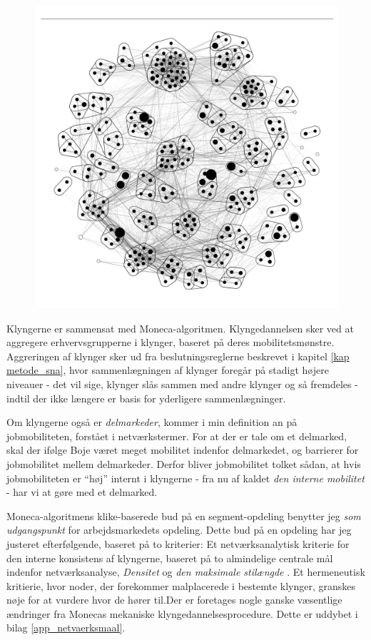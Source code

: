 \begin{figure}[H]
\begin{centering}
  \includegraphics[width=10 cm]{fig/netvaerkskort/kort_seg_proces_niveau5_praesentation.pdf}
  \caption{}
  \label{fig_seg_proces5}
\end{centering}
\end{figure}

Klyngerne er sammensat med Moneca-algoritmen. Klyngedannelsen sker ved at aggregere erhvervsgrupperne i klynger, baseret på deres mobilitetsmønstre. Aggreringen af klynger sker ud fra beslutningsreglerne beskrevet i kapitel \ref{kap metode_sna}, hvor sammenlægningen af klynger foregår på stadigt højere niveauer - det vil sige, klynger slås sammen med andre klynger og så fremdeles - indtil der ikke længere er basis for yderligere sammenlægninger. 

Om klyngerne også er \emph{delmarkeder}, kommer i min definition an på jobmobiliteten, forstået i netværkstermer. For at der er tale om et delmarked, skal der ifølge Boje været meget mobilitet indenfor delmarkedet, og barrierer for jobmobilitet mellem  delmarkeder. Derfor bliver jobmobilitet tolket sådan, at hvis jobmobiliteten er “høj” internt i klyngerne - fra nu af kaldet \emph{den interne mobilitet} - har vi at gøre med et delmarked. 

Moneca-algoritmens klike-baserede bud på en segment-opdeling benytter jeg \emph{som udgangspunkt} for arbejdsmarkedets opdeling. Dette bud på en opdeling har jeg justeret efterfølgende, baseret på to kriterier: Et netværksanalytisk kriterie for den interne konsistens af klyngerne, baseret på to almindelige centrale mål indenfor netværksanalyse,   \emph{Densitet} og \emph{den maksimale stilængde} \parencite[68f]{Scott2000}. Et hermeneutisk kritierie, hvor noder, der forekommer malplacerede i bestemte klynger, granskes nøje for at vurdere hvor de hører til.Der er foretages nogle ganske væsentlige ændringer fra Monecas mekaniske klyngedannelsesprocedure. Dette er uddybet i bilag \ref{app_netvaerksmaal}.  

